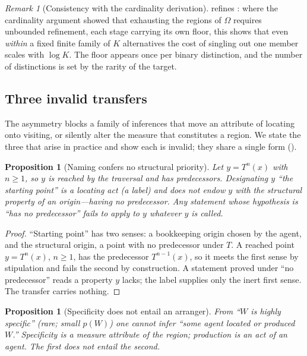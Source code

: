 \documentclass[11pt,a4paper]{article}
\theoremstyle{thmstyle}
\newtheorem{proposition}[theorem]{Proposition}
\theoremstyle{definition}
\theoremstyle{remark}
\newtheorem{remark}[theorem]{Remark}
\newcommand{\Space}{\Omega}
\begin{document}
\begin{remark}[Consistency with the cardinality derivation]
\label{rem:consistent-card}
 refines : where the cardinality argument
showed that exhausting the regions of $\Space$ requires unbounded refinement, each
stage carrying its own floor, this shows that even \emph{within} a fixed finite
family of $K$ alternatives the cost of singling out one member scales with
$\log K$. The floor appears once per binary distinction, and the number of
distinctions is set by the rarity of the target.
\end{remark}

\subsection{Three invalid transfers}

The asymmetry blocks a family of inferences that move an attribute of locating
onto visiting, or silently alter the measure that constitutes a region. We state
the three that arise in practice and show each is invalid; they share a single
form ().

\begin{proposition}[Naming confers no structural priority]
\label{prop:rename}
Let $y=T^{n}(x)$ with $n\ge1$, so $y$ is reached by the traversal and has
predecessors. Designating $y$ ``the starting point'' is a locating act
\textup{(}a label\textup{)} and does not endow $y$ with the structural property
of an origin---having no predecessor. Any statement whose hypothesis is ``has no
predecessor'' fails to apply to $y$ whatever $y$ is called.
\end{proposition}

\begin{proof}
``Starting point'' has two senses: a bookkeeping origin chosen by the agent, and
the structural origin, a point with no predecessor under $T$. A reached point
$y=T^{n}(x)$, $n\ge1$, has the predecessor $T^{n-1}(x)$, so it meets the first
sense by stipulation and fails the second by construction. A statement proved
under ``no predecessor'' reads a property $y$ lacks; the label supplies only the
inert first sense. The transfer carries nothing.
\end{proof}

\begin{proposition}[Specificity does not entail an arranger]
\label{prop:arrange}
From ``$W$ is highly specific'' \textup{(}rare; small $p(W)$\textup{)} one cannot
infer ``some agent located or produced $W$.'' Specificity is a measure attribute
of the region; production is an act of an agent. The first does not entail the
second.
\end{proposition}
\end{document}
